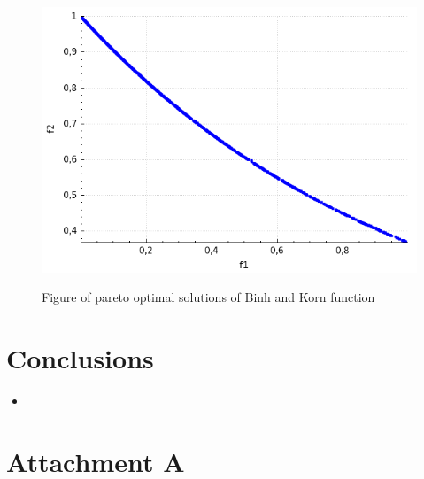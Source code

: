 \documentclass[a4paper, 11pt]{article}
\begin{document}
	\begin{figure}[H]
	\centering
	\includegraphics[scale=0.4]{ctp1}
	\label{fig:ctp1}
	\caption{Figure of pareto optimal solutions of Binh and Korn function}
	\end{figure}

	\newpage
	\section{Conclusions}
	
	\begin{itemize}
		\item
	\end{itemize}
	
	\newpage	
	\section*{Attachment A}
	
\end{document}
